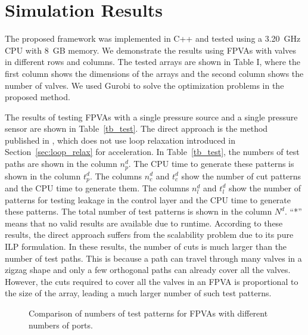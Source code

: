 \section{Simulation Results}\label{sec:results}

The proposed framework was implemented in C++ and tested
using a \SI[mode=text]{3.20}{\GHz} CPU with 
\SI{8}{GB} memory.
We demonstrate
the results using FPVAs with valves in different rows and columns. The
tested arrays are shown in Table I, where the first column shows
the dimensions of the arrays and the second column shows
the number of valves. 
We used Gurobi \cite{gurobi} to solve the optimization problems in the
proposed method.

The results of testing FPVAs with a single pressure source and a single pressure sensor
are shown in Table~\ref{tb_test}.
The direct approach is the method published in \cite{CBBK17}, which
does not use loop relaxation introduced in Section~\ref{sec:loop_relax} for
acceleration. In Table~\ref{tb_test}, the
numbers of test paths are shown in the column $n^d_p$. The CPU time to
generate these patterns is shown in the column $t^d_p$. The columns $n^d_c$ and
$t^d_c$ show the number of cut patterns and the CPU time to generate them.
The columns $n^d_l$ and $t_l^d$ show the number of patterns for testing leakage in the
control layer and the CPU time to generate these patterns. The
total number of test patterns is shown in the column $N^d$. 
``*'' means that no valid results are available 
due to runtime.
According to these results, the direct approach suffers from the scalability problem
due to its pure ILP formulation.
In these results, the number of cuts is much larger than the number of test
paths. This is because a path can travel through many valves in a zigzag shape and 
only a few orthogonal paths can already cover all the valves.
However, the cuts required to cover all the valves in an
FPVA is proportional to the size of the array, leading a much larger number of
such test patterns.

\begin{figure}[t]
{\figurefontsize
\centering

%
\caption{Comparison of numbers of test patterns for FPVAs with different numbers of ports.}
\label{fig:port_test}
}
\end{figure}

